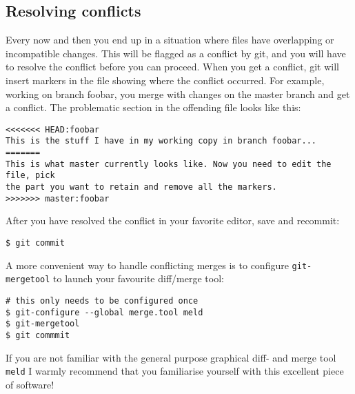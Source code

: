 \documentclass[a4paper,10pt]{article}
\begin{document}
\subsection{Resolving conflicts}
\label{sec:conflict}
Every now and then you end up in a situation where files have overlapping or
incompatible changes. This will be flagged as a conflict by git, and you will
have to resolve the conflict before you can proceed. When you get a conflict,
git will insert markers in the file showing where the conflict occurred. For
example, working on branch foobar, you merge with changes on the master branch
and get a conflict. The problematic section in the offending file looks like
this:
\begin{verbatim}
<<<<<<< HEAD:foobar
This is the stuff I have in my working copy in branch foobar...
=======
This is what master currently looks like. Now you need to edit the file, pick
the part you want to retain and remove all the markers.
>>>>>>> master:foobar
\end{verbatim}
After you have resolved the conflict in your favorite editor, save and
recommit:
\begin{verbatim}
$ git commit
\end{verbatim}
A more convenient way to handle conflicting merges is to configure
\texttt{git-mergetool} to launch your favourite diff/merge tool:
\begin{verbatim}
# this only needs to be configured once
$ git-configure --global merge.tool meld
$ git-mergetool
$ git commmit
\end{verbatim}
If you are not familiar with the general purpose graphical diff- and merge
tool \texttt{meld} I warmly recommend that you familiarise yourself with this
excellent piece of software!
\end{document}
